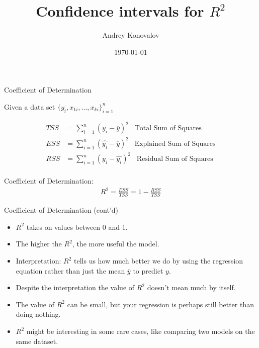 \documentclass[10pt,pdf]{beamer}
\title{Confidence intervals for $R^2$}
\author{Andrey Konovalov}
\institute{МIPT}
\date{\today}
\begin{document}

\begin{frame}
	\titlepage
\end{frame}


\begin{frame}[t]{Coefficient of Determination}

Given a data set $\{y_i, x_{1i}, ..., x_{ki}\}_{i=1}^n$

\begin{align*}
  TSS &= \sum\limits_{i=1}^n (y_i - \overline{y})^2 \;\;\; \text{Total Sum of Squares} \\
  ESS &= \sum\limits_{i=1}^n (\hat{y_i} - \overline{y})^2 \;\;\; \text{Explained Sum of Squares} \\
  RSS &= \sum\limits_{i=1}^n (y_i - \hat{y_i})^2 \;\;\; \text{Residual Sum of Squares} \\
\end{align*}

Coefficient of Determination:
\begin{align*}
  R^2 = \frac{ESS}{TSS} = 1 - \frac{RSS}{TSS}
\end{align*}

\end{frame}


\begin{frame}[t]{Coefficient of Determination (cont’d)}

\begin{itemize}
  \setlength{\itemsep}{15pt}
  \item $R^2$ takes on values between 0 and 1.
  \item The higher the $R^2$, the more useful the model.
  \item Interpretation: $R^2$ tells us how much better we do by using the regression equation rather than just the mean $\overline{y}$ to predict $y$.
  \item Despite the interpretation the value of $R^2$ doesn't mean much by itself.
  \item The value of $R^2$ can be small, but your regression is perhaps still better than doing nothing.
  \item $R^2$ might be interesting in some rare cases, like comparing two models on the same dataset.
\end{itemize}

\end{frame}
\end{document}
